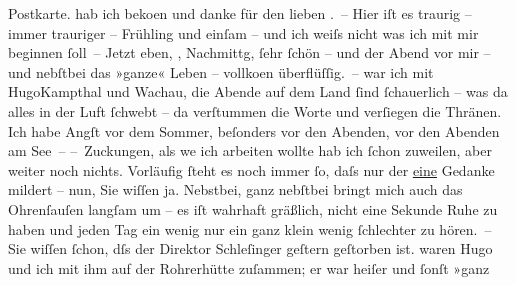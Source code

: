 \begin{ledgroupsized}[t]{13cm}
{{{                  Postkarte.}}}\label{K_L00921_1h} hab ich beko{\geminationm}en und danke für den
               lieben \label{K_L00921_2v}\label{K_L00921_2h}. – Hier iſt es traurig – immer trauriger – Frühling und einſam – und
               ich weiſs nicht was ich mit mir beginnen ſoll –\pend
           \pstart
           Jetzt eben, \label{K_L00921_3v}\label{K_L00921_3h}, Nachmittg, ſehr ſchön
               – und der Abend vor mir – und nebſtbei das »ganze« Leben – vollko{\geminationm}en {\pb}überflüſſig. –\pend
           \pstart
           \label{K_L00921_4v}\label{K_L00921_4h} war ich mit HugoKampthal und Wachau, die Abende auf dem Land ſind ſchauerlich – was da alles in der Luft
               ſchwebt – da verſtummen die Worte und verſiegen die Thränen. Ich habe Angſt vor dem
               Sommer, beſonders vor den Abenden, vor den Abenden am See –\pend
           \pstart
           – Zuckungen, als we{\geminationn} ich {\pb}arbeiten wollte hab ich ſchon zuweilen, aber weiter noch nichts. Vorläufig ſteht es
               noch immer ſo, daſs nur der \uline{eine} Gedanke mildert –
               nun, Sie wiſſen ja.\pend
           \pstart
           Nebstbei, ganz nebſtbei bringt mich auch das Ohrenſauſen langſam um – es iſt wahrhaft
               gräßlich, nicht eine Sekunde Ruhe zu haben und jeden Tag ein wenig nur {\pb}ein ganz klein wenig ſchlechter zu hören. –\pend
           \pstart
           Sie wiſſen ſchon, dſs der Direktor Schleſinger
               geſtern geſtorben ist. \label{K_L00921_5v}\label{K_L00921_5h} waren Hugo und ich mit ihm auf der Rohrerhütte zuſammen; er war heiſer und ſonſt »ganz

\end{ledgroupsized}
